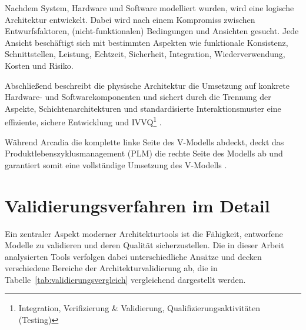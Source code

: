 Nachdem System, Hardware und Software modelliert wurden, wird eine logische Architektur entwickelt. Dabei wird nach einem Kompromiss zwischen Entwurfsfaktoren, (nicht-funktionalen) Bedingungen und Ansichten gesucht. Jede Ansicht beschäftigt sich mit bestimmten Aspekten wie funktionale Konsistenz, Schnittstellen, Leistung, Echtzeit, Sicherheit, Integration, Wiederverwendung, Kosten und Risiko.

Abschließend beschreibt die physische Architektur die Umsetzung auf konkrete Hardware- und Softwarekomponenten und sichert durch die Trennung der Aspekte, Schichtenarchitekturen und standardisierte Interaktionsmuster eine effiziente, sichere Entwicklung und IVVQ\footnote{Integration, Verifizierung \& Validierung, Qualifizierungsaktivitäten (Testing)} \cite{let}.

Während Arcadia die komplette linke Seite des V-Modells abdeckt, deckt das Produktlebenszyklusmanagement (PLM) die rechte Seite des Modells ab und garantiert somit eine vollständige Umsetzung des V-Modells \cite{2024arcadia}.

\section{Validierungsverfahren im Detail}

Ein zentraler Aspekt moderner Architekturtools ist die Fähigkeit, entworfene Modelle zu validieren und deren Qualität sicherzustellen. Die in dieser Arbeit analysierten Tools verfolgen dabei unterschiedliche Ansätze und decken verschiedene Bereiche der Architekturvalidierung ab, die in Tabelle~\ref{tab:validierungsvergleich} vergleichend dargestellt werden.

